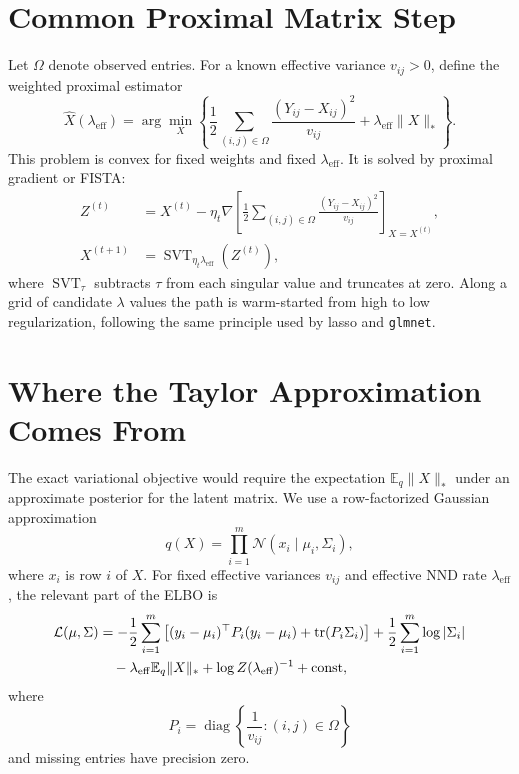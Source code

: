 \documentclass[11pt]{article}
\begin{document}
\section{Common Proximal Matrix Step}

Let $\Omega$ denote observed entries.  For a known effective variance
$v_{ij}>0$, define the weighted proximal estimator
\begin{equation}
    \hat X(\lambda_{\mathrm{eff}})
    =
    \arg\min_X
    \left\{
        \frac{1}{2}
        \sum_{(i,j)\in\Omega}
        \frac{(Y_{ij}-X_{ij})^2}{v_{ij}}
        +
        \lambda_{\mathrm{eff}}\|X\|_*
    \right\}.
    \label{eq:common-prox}
\end{equation}
This problem is convex for fixed weights and fixed
$\lambda_{\mathrm{eff}}$.  It is solved by proximal gradient or FISTA:
\begin{align}
    Z^{(t)}
        &=
        X^{(t)} - \eta_t \nabla
        \left[
            \frac{1}{2}
            \sum_{(i,j)\in\Omega}
            \frac{(Y_{ij}-X_{ij})^2}{v_{ij}}
        \right]_{X=X^{(t)}},\\
    X^{(t+1)}
        &=
        \operatorname{SVT}_{\eta_t\lambda_{\mathrm{eff}}}
        \!\left(Z^{(t)}\right),
\end{align}
where $\operatorname{SVT}_{\tau}$ subtracts $\tau$ from each singular value and truncates at zero.  Along a grid of candidate $\lambda$ values the path is warm-started from high to low regularization, following the same principle used by lasso and \texttt{glmnet}.

\section{Where the Taylor Approximation Comes From}

The exact variational objective would require the expectation
$\mathbb{E}_q\|X\|_*$ under an approximate posterior for the latent matrix.  We
use a row-factorized Gaussian approximation
\begin{equation}
    q(X)
    =
    \prod_{i=1}^m
    \mathcal{N}(x_i\mid \mu_i,\Sigma_i),
\end{equation}
where $x_i$ is row $i$ of $X$.  For fixed effective variances $v_{ij}$ and
effective NND rate $\lambda_{\mathrm{eff}}$, the relevant part of the ELBO is
\begin{align}
    \mathcal{L}(\mu,\Sigma)
    &=
    -\frac{1}{2}
    \sum_{i=1}^m
    \left[
        (y_i-\mu_i)^\top P_i (y_i-\mu_i)
        +
        \operatorname{tr}(P_i\Sigma_i)
    \right]
    +
    \frac{1}{2}\sum_{i=1}^m \log|\Sigma_i| \notag\\
    &\quad
    -
    \lambda_{\mathrm{eff}}\mathbb{E}_q\|X\|_*
    +
    \log Z(\lambda_{\mathrm{eff}})^{-1}
    +
    \mathrm{const},
    \label{eq:pre-taylor-elbo}
\end{align}
where
\begin{equation}
    P_i
    =
    \operatorname{diag}
    \left\{
        \frac{1}{v_{ij}}:(i,j)\in\Omega
    \right\}
\end{equation}
and missing entries have precision zero.
\end{document}
